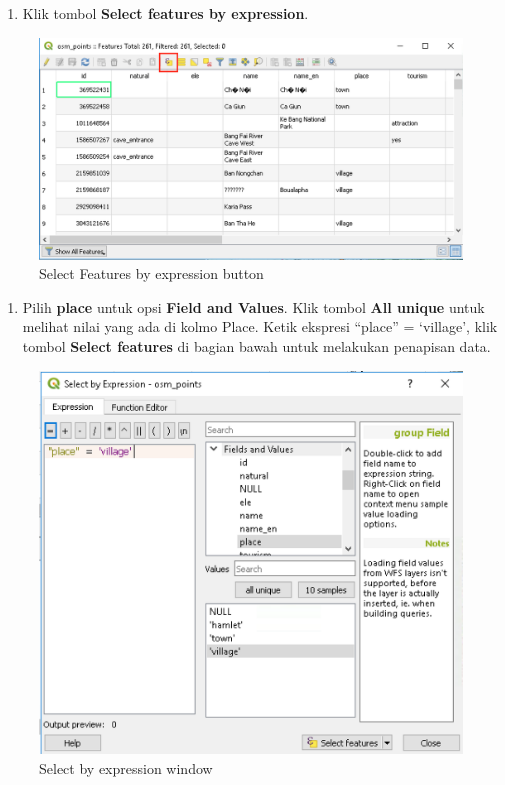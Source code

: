 \documentclass[]{book}
\providecommand{\tightlist}{%
  \setlength{\itemsep}{0pt}\setlength{\parskip}{0pt}}
\begin{document}
\begin{enumerate}
\def\labelenumi{\arabic{enumi}.}
\setcounter{enumi}{2}
\tightlist
\item
  Klik tombol \textbf{Select features by expression}.
\end{enumerate}

\begin{figure}

{\centering \includegraphics[width=0.7\linewidth]{images/04/fig25} 

}

\caption{Select Features by expression button}\label{fig:fig1425}
\end{figure}

\begin{enumerate}
\def\labelenumi{\arabic{enumi}.}
\setcounter{enumi}{3}
\tightlist
\item
  Pilih \textbf{place} untuk opsi \textbf{Field and Values}. Klik tombol \textbf{All unique} untuk melihat nilai yang ada di kolmo Place. Ketik ekspresi ``place'' = `village', klik tombol \textbf{Select features} di bagian bawah untuk melakukan penapisan data.
\end{enumerate}

\begin{figure}

{\centering \includegraphics[width=0.7\linewidth]{images/04/fig26} 

}

\caption{Select by expression window}\label{fig:fig1426}
\end{figure}
\end{document}
